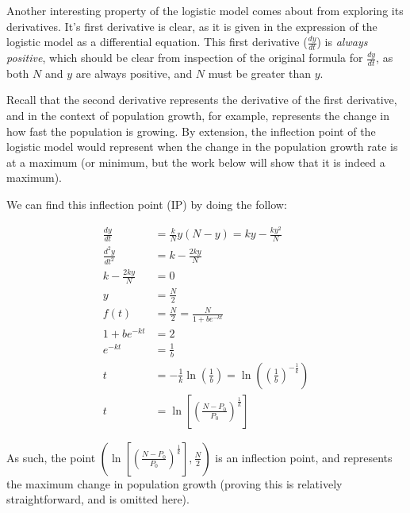 \documentclass[12pt]{article}
\begin{document}
\begin{itemize}
    Another interesting property of the logistic model comes about from exploring its derivatives. It's first derivative is clear, as it is given in the expression of the logistic model as a differential equation. This first derivative ($\frac{dy}{dt}$) is \textit{always positive}, which should be clear from inspection of the original formula for $\frac{dy}{dt}$, as both $N$ and $y$ are always positive, and $N$ must be greater than $y$.

    Recall that the second derivative represents the derivative of the first derivative, and in the context of population growth, for example, represents the change in how fast the population is growing. By extension, the inflection point of the logistic model would represent when the change in the population growth rate is at a maximum (or minimum, but the work below will show that it is indeed a maximum).

    We can find this inflection point (IP) by doing the follow:

    \begin{equation}
        \begin{split}
            \frac{dy}{dt} &= \frac{k}{N}y(N-y) = ky - \frac{ky^2}{N}\\
            \frac{d^2y}{dt^2} &= k - \frac{2ky}{N}\\
            k - \frac{2ky}{N} &= 0\\
            y &= \frac{N}{2}\\
            f(t) &= \frac{N}{2} = \frac{N}{1+be^{-kt}}\\
            1+be^{-kt} &= 2\\
            e^{-kt} &= \frac{1}{b}\\
            t &= -\frac{1}{k}\ln(\frac{1}{b}) = \ln((\frac{1}{b})^{-\frac{1}{k}})\\
            t &= \ln[(\frac{N-P_0}{P_0})^{\frac{1}{k}}]
        \end{split}
    \end{equation}

    As such, the point $(\ln[(\frac{N-P_0}{P_0})^{\frac{1}{k}}],\frac{N}{2})$ is an inflection point, and represents the maximum change in population growth (proving this is relatively straightforward, and is omitted here).


\end{itemize}
\end{document}
